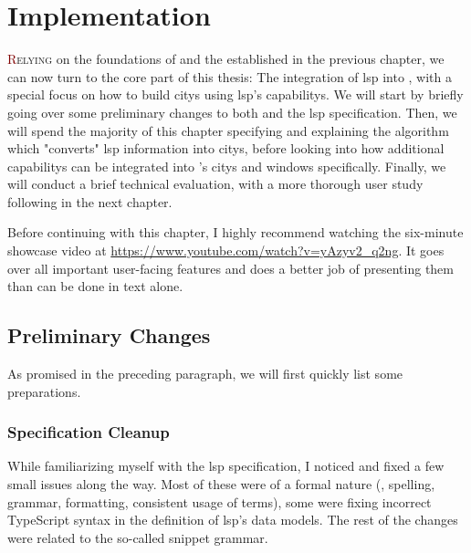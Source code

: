 \documentclass[../thesis]{subfiles}
\begin{document}
\chapter{Implementation}\label{ch:implementation}

\lettrine[lines=3]{\textcolor{Maroon}{R}}{elying} on the foundations of \SEE{} and the  established in the previous chapter, we can now turn to the core part of this thesis:
The integration of \gls{lsp} into \SEE{}, with a special focus on how to build \glspl{city} using \gls{lsp}'s \glspl{capability}.
We will start by briefly going over some preliminary changes to both \SEE{} and the \gls{lsp} specification.
Then, we will spend the majority of this chapter specifying and explaining the algorithm which "converts" \gls{lsp} information into \glspl{city}, before looking into how additional \glspl{capability} can be integrated into \SEE{}'s \glspl{city} and \glspl{window} specifically.
Finally, we will conduct a brief technical evaluation, with a more thorough user study following in the next chapter.

Before continuing with this chapter, I highly recommend watching the six-minute showcase video at \url{https://www.youtube.com/watch?v=yAzyv2_q2ng}.
It goes over all important user-facing features and does a better job of presenting them than can be done in text alone.

\section{Preliminary Changes}
As promised in the preceding paragraph, we will first quickly list some preparations.

\subsection{Specification Cleanup}
While familiarizing myself with the \gls{lsp} specification, I noticed and fixed a few small issues along the way.
Most of these were of a formal nature (\eg, spelling, grammar, formatting, consistent usage of terms), some were fixing incorrect TypeScript syntax in the definition of \gls{lsp}'s data models.
The rest of the changes were related to the so-called snippet grammar.
\end{document}
